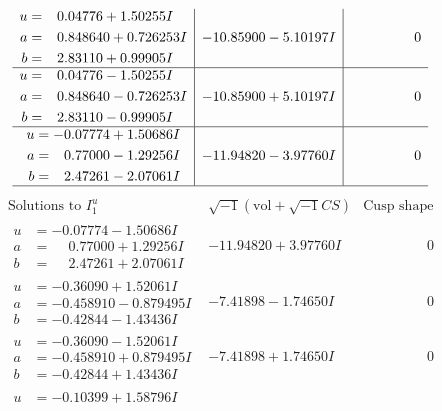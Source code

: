 \documentclass[1p]{elsarticle_modified}
\theoremstyle{definition}
\newcommand{\I}{\sqrt{-1}}
\begin{document}
$$\begin{array}{c|c|c}
\begin{aligned}
u &= \phantom{-}0.04776 + 1.50255 I \\
a &= \phantom{-}0.848640 + 0.726253 I \\
b &= \phantom{-}2.83110 + 0.99905 I\end{aligned}
 & -10.85900 - 5.10197 I & \phantom{-0.000000 } 0 \\ \hline\begin{aligned}
u &= \phantom{-}0.04776 - 1.50255 I \\
a &= \phantom{-}0.848640 - 0.726253 I \\
b &= \phantom{-}2.83110 - 0.99905 I\end{aligned}
 & -10.85900 + 5.10197 I & \phantom{-0.000000 } 0 \\ \hline\begin{aligned}
u &= -0.07774 + 1.50686 I \\
a &= \phantom{-}0.77000 - 1.29256 I \\
b &= \phantom{-}2.47261 - 2.07061 I\end{aligned}
 & -11.94820 - 3.97760 I & \phantom{-0.000000 } 0\\
 \hline 
 \end{array}$$\newpage$$\begin{array}{c|c|c}  
\text{Solutions to }I^u_{1}& \I (\text{vol} + \sqrt{-1}CS) & \text{Cusp shape}\\
 \hline 
\begin{aligned}
u &= -0.07774 - 1.50686 I \\
a &= \phantom{-}0.77000 + 1.29256 I \\
b &= \phantom{-}2.47261 + 2.07061 I\end{aligned}
 & -11.94820 + 3.97760 I & \phantom{-0.000000 } 0 \\ \hline\begin{aligned}
u &= -0.36090 + 1.52061 I \\
a &= -0.458910 - 0.879495 I \\
b &= -0.42844 - 1.43436 I\end{aligned}
 & -7.41898 - 1.74650 I & \phantom{-0.000000 } 0 \\ \hline\begin{aligned}
u &= -0.36090 - 1.52061 I \\
a &= -0.458910 + 0.879495 I \\
b &= -0.42844 + 1.43436 I\end{aligned}
 & -7.41898 + 1.74650 I & \phantom{-0.000000 } 0 \\ \hline\begin{aligned}
u &= -0.10399 + 1.58796 I \\

\end{aligned}
\end{array}$$
\end{document}
